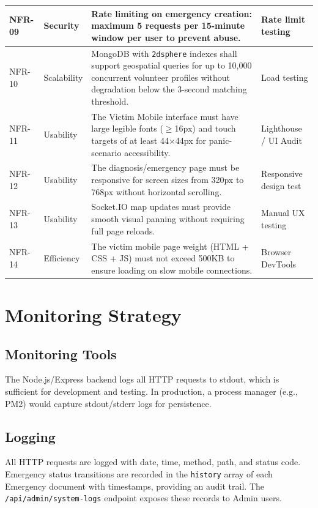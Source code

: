 \documentclass[12pt,a4paper]{article}
\begin{document}
\begin{longtable}{|p{1.3cm}|p{2.3cm}|p{8cm}|p{2.5cm}|}
NFR-09 & Security &
Rate limiting on emergency creation: maximum 5 requests per 15-minute window per user to prevent abuse. &
Rate limit testing \\
\hline

NFR-10 & Scalability &
MongoDB with \texttt{2dsphere} indexes shall support geospatial queries for up to 10,000 concurrent volunteer profiles without degradation below the 3-second matching threshold. &
Load testing \\
\hline

NFR-11 & Usability &
The Victim Mobile interface must have large legible fonts ($\geq$16px) and touch targets of at least 44$\times$44px for panic-scenario accessibility. &
Lighthouse / UI Audit \\
\hline

NFR-12 & Usability &
The diagnosis/emergency page must be responsive for screen sizes from 320px to 768px without horizontal scrolling. &
Responsive design test \\
\hline

NFR-13 & Usability &
Socket.IO map updates must provide smooth visual panning without requiring full page reloads. &
Manual UX testing \\
\hline

NFR-14 & Efficiency &
The victim mobile page weight (HTML + CSS + JS) must not exceed 500KB to ensure loading on slow mobile connections. &
Browser DevTools \\
\hline

\end{longtable}

\section{Monitoring Strategy}

\subsection{Monitoring Tools}
The Node.js/Express backend logs all HTTP requests to stdout, which is sufficient for development and testing. In production, a process manager (e.g., PM2) would capture stdout/stderr logs for persistence.

\subsection{Logging}
All HTTP requests are logged with date, time, method, path, and status code. Emergency status transitions are recorded in the \texttt{history} array of each Emergency document with timestamps, providing an audit trail. The \texttt{/api/admin/system-logs} endpoint exposes these records to Admin users.
\end{document}
